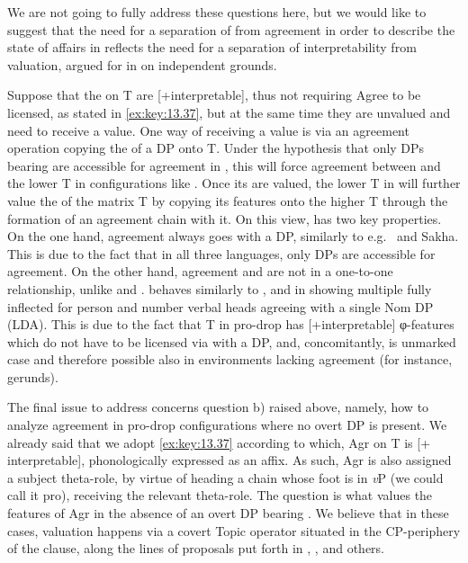 \documentclass[output=paper]{langsci/langscibook}
\begin{document}
\begin{exe}
We are not going to fully address these questions here, but we would like to
suggest that the need for a separation of  from agreement in order
to describe the state of affairs in  reflects the need for a
separation of interpretability from valuation, argued for in
\citet{PesetskyTorrego2007} on independent grounds.

Suppose that the  on T are [+interpretable], thus not requiring
Agree to be licensed, as stated in \eqref{ex:key:13.37}, but at the same time
they are unvalued and need to receive a value. One way of receiving a value is
via an agreement operation copying the  of a DP onto T. Under the
hypothesis that only DPs bearing \Nom{} are accessible for agreement in ,
this will force agreement between \Nom{} and the lower T in configurations like
. Once its  are valued, the lower T in 
will further value the  of the matrix T by copying its features
onto the higher T through the formation of an agreement chain with it. On this
view,  has two key properties. On the one hand, agreement always goes with
a \Nom{} DP, similarly to e.g.\  and Sakha. This is due to the
fact that in all three languages, only \Nom{} DPs are accessible for agreement.
On the other hand, agreement and \Nom{} are not in a one-to-one relationship,
unlike  and .  behaves similarly to
,  and  in showing multiple fully inflected
for person and number verbal heads agreeing with a single Nom DP
(\gls{LDA}). This is due to the fact that T in pro-drop
 has [+interpretable] φ-features which do not have to be licensed
via  with a \Nom{} DP, and, concomitantly, \Nom{} is unmarked case
and therefore possible also in environments lacking agreement (for instance,
gerunds).

The final issue to address concerns question b) raised above, namely, how to
analyze agreement in pro-drop configurations where no overt DP is present. We
already said that we adopt \eqref{ex:key:13.37} according to which, Agr on T is
[+ interpretable], phonologically expressed as an affix. As such, Agr is also
assigned a subject theta-role, by virtue of heading a chain whose foot is in
\emph{v}P (we could call it pro), receiving the relevant theta-role. The
question is what values the features of Agr in the absence of an overt DP
bearing \Nom{}. We believe that in these cases, valuation happens via a covert
Topic operator situated in the CP-periphery of the clause, along the lines of
proposals put forth in \citet{Frascarelli2007}, \citet{FraHin2007},
\citet{Miyagawa2017} and others.


\end{exe}
\end{document}

